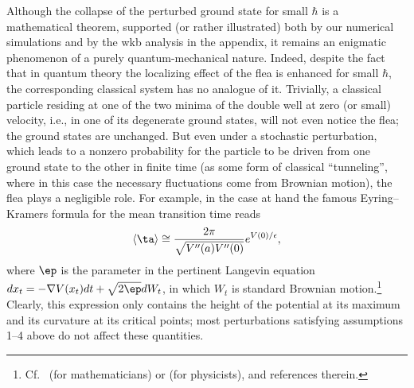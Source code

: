 \documentclass[12pt]{article}
\begin{document}
Although the collapse of the perturbed ground state for small $\hbar$  is a mathematical theorem, supported (or rather illustrated) both by our numerical simulations and by the {\sc wkb} analysis in the appendix, it remains an enigmatic phenomenon of a purely quantum-mechanical nature. 
Indeed, despite the fact that in quantum theory the localizing  effect of the flea is enhanced for small $\hbar$, the corresponding classical system has no analogue of it. Trivially, a classical particle residing at one of the two minima of the double well at zero (or small) velocity, i.e., in one of its degenerate ground states, will not even notice the flea; the ground states are unchanged. But even under a stochastic perturbation, which leads to a nonzero probability for the particle to be driven from one ground state to the other in finite time (as some form of classical ``tunneling'', where in this case the necessary fluctuations come from Brownian motion), the flea plays a negligible role. For example,  in the case at hand  the famous Eyring--Kramers formula for the mean transition time reads
\begin{equation}
\langle \ta\rangle \cong \frac{2\pi}{\sqrt{V''(a)V''(0)}}e^{V(0)/\epsilon},
\end{equation}
where $\ep$ is the parameter in the pertinent Langevin equation $dx_t=-\nabla V(x_t)dt +\sqrt{2\ep} dW_t$, in which $W_t$ is standard Brownian motion.\footnote{Cf.\ \cite{Berglund} (for mathematicians)  or \cite{HTB} (for physicists), and references therein.} Clearly, this expression  only contains the height of the potential at its maximum and its curvature at its critical points; most perturbations satisfying assumptions 1--4 above do not affect these quantities. 
\end{document}
